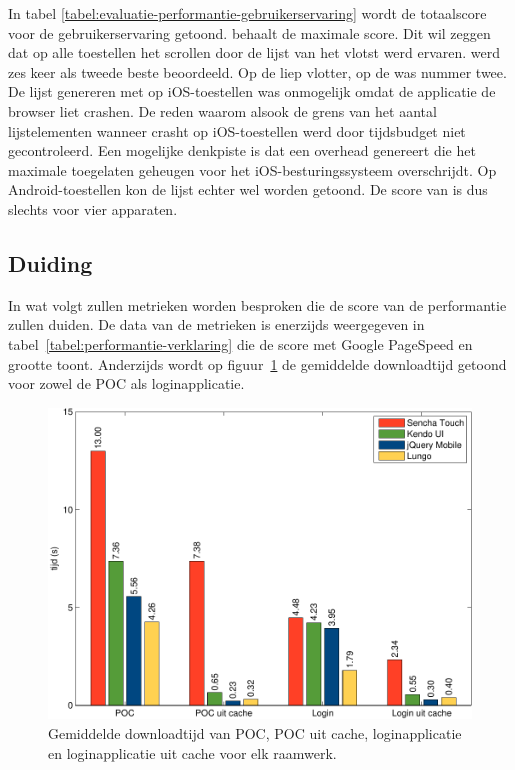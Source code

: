 In tabel \ref{tabel:evaluatie-performantie-gebruikerservaring} wordt de totaalscore voor de gebruikerservaring getoond.
\st{} behaalt de maximale score.
Dit wil zeggen dat op alle toestellen het scrollen door de lijst van \st{} het vlotst werd ervaren.
\jqm{} werd zes keer als tweede beste beoordeeld. 
Op de \htc{} liep \kendo{} vlotter,  op de \ipadi{} was \lungo{} nummer twee.
De lijst genereren met \kendo{} op iOS-toestellen was onmogelijk omdat de applicatie de browser liet crashen.
De reden waarom alsook de grens van het aantal lijstelementen wanneer \kendo{} crasht op iOS-toestellen werd door tijdsbudget niet gecontroleerd.
Een mogelijke denkpiste is dat \kendo{} een overhead genereert die het maximale toegelaten geheugen voor het iOS-besturingssysteem overschrijdt.
Op Android-toestellen kon de lijst echter wel worden getoond.
De score van \kendo{} is dus slechts voor vier apparaten.


\subsection{Duiding}
\label{sec:evaluatie-performantie-duiding}

In wat volgt zullen metrieken worden besproken die de score van de performantie zullen duiden.
De data van de metrieken is enerzijds weergegeven in tabel~\ref{tabel:performantie-verklaring} die de score met Google PageSpeed en grootte toont.
Anderzijds wordt op figuur~\ref{fig:performantie} de gemiddelde downloadtijd getoond voor zowel de POC als loginapplicatie.

\begin{figure}
 \centering
 \includegraphics[width=\textwidth]{figuren/performance-nl.pdf}
 \caption{Gemiddelde downloadtijd van POC,  POC uit cache,  loginapplicatie en loginapplicatie uit cache voor elk raamwerk.}
 \label{fig:performantie}
\end{figure}

